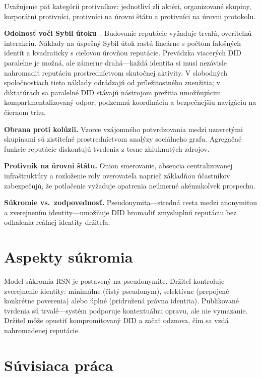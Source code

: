 \documentclass[11pt,a4paper,twocolumn]{article}
\begin{document}
Uvažujeme päť kategórií protivníkov: jednotliví zlí aktéri, organizované skupiny, korporátni protivníci, protivníci na úrovni štátu a protivníci na úrovni protokolu.

\textbf{Odolnosť voči Sybil útoku}~\cite{douceur2002}. Budovanie reputácie vyžaduje trvalú, overiteľnú interakciu. Náklady na úspešný Sybil útok rastú lineárne s počtom falošných identít a kvadraticky s cieľovou úrovňou reputácie. Prevádzka viacerých DID paralelne je možná, ale zámerne drahá---každá identita si musí nezávisle nahromadiť reputáciu prostredníctvom skutočnej aktivity. V slobodných spoločnostiach tieto náklady odrádzajú od príležitostného zneužitia; v diktatúrach sa paralelné DID stávajú nástrojom prežitia umožňujúcim kompartmentalizovaný odpor, podzemnú koordináciu a bezpečnejšiu navigáciu na čiernom trhu.

\textbf{Obrana proti kolúzii.} Vzorce vzájomného potvrdzovania medzi uzavretými skupinami sú zistiteľné prostredníctvom analýzy sociálneho grafu. Agregačné funkcie reputácie diskontujú tvrdenia z tesne zhluknutých zdrojov.

\textbf{Protivník na úrovni štátu.} Onion smerovanie, absencia centralizovanej infraštruktúry a rozloženie roly overovateľa naprieč základňou účastníkov zabezpečujú, že potlačenie vyžaduje opatrenia neúmerné akémukoľvek prospechu.

\textbf{Súkromie vs.\ zodpovednosť.} Pseudonymita---stredná cesta medzi anonymitou a zverejnením identity---umožňuje DID hromadiť zmysluplnú reputáciu bez odhalenia reálnej identity držiteľa.

\section{Aspekty súkromia}

Model súkromia RSN je postavený na pseudonymite. Držiteľ kontroluje zverejnenie identity: minimálne (čistý pseudonym), selektívne (prepojené konkrétne poverenia) alebo úplné (pridružená právna identita). Publikované tvrdenia sú trvalé---systém podporuje kontextuálnu opravu, ale nie vymazanie. Držiteľ môže opustiť kompromitovaný DID a začať odznova, čím sa vzdá nahromadenej reputácie.

\section{Súvisiaca práca}
\end{document}
